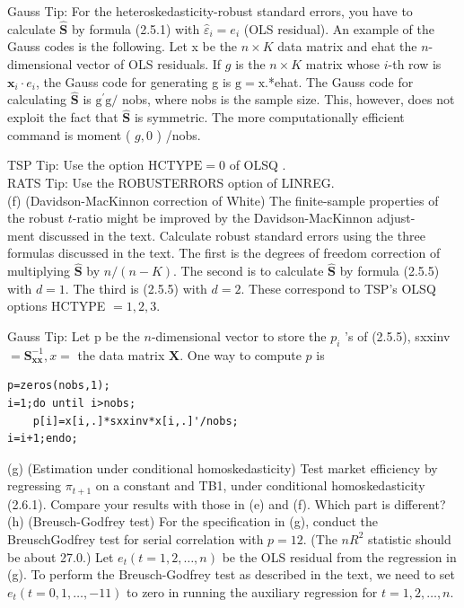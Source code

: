 \documentclass[10pt]{article}
\begin{document}
Gauss Tip: For the heteroskedasticity-robust standard errors, you have to calculate $\widehat{\mathbf{S}}$ by formula (2.5.1) with $\hat{\varepsilon}_{i}=e_{i}$ (OLS residual). An example of the Gauss codes is the following. Let x be the $n \times K$ data matrix and ehat the $n$-dimensional vector of OLS residuals. If $g$ is the $n \times K$ matrix whose $i$-th row is $\mathbf{x}_{i} \cdot e_{i}$, the Gauss code for generating g is $\mathrm{g}=\mathrm{x}$.*ehat. The Gauss code for calculating $\widehat{\mathbf{S}}$ is $\mathrm{g}^{\prime} \mathrm{g} /$ nobs, where nobs is the sample size. This, however, does not exploit the fact that $\widehat{\mathbf{S}}$ is symmetric. The more computationally efficient command is moment ( $g, 0$ ) /nobs.

TSP Tip: Use the option $\mathrm{HCTYPE}=0$ of OLSQ .\\
RATS Tip: Use the ROBUSTERRORS option of LINREG.\\
(f) (Davidson-MacKinnon correction of White) The finite-sample properties of the robust $t$-ratio might be improved by the Davidson-MacKinnon adjust-\\
ment discussed in the text. Calculate robust standard errors using the three formulas discussed in the text. The first is the degrees of freedom correction of multiplying $\widehat{\mathbf{S}}$ by $n /(n-K)$. The second is to calculate $\widehat{\mathbf{S}}$ by formula (2.5.5) with $d=1$. The third is (2.5.5) with $d=2$. These correspond to TSP's OLSQ options HCTYPE $=1,2,3$.

Gauss Tip: Let p be the $n$-dimensional vector to store the $p_{i}$ 's of (2.5.5), sxxinv $=\mathbf{S}_{\mathbf{x x}}^{-1}, x=$ the data matrix $\mathbf{X}$. One way to compute $p$ is

\begin{verbatim}
p=zeros(nobs,1);
i=1;do until i>nobs;
    p[i]=x[i,.]*sxxinv*x[i,.]'/nobs;
i=i+1;endo;
\end{verbatim}

(g) (Estimation under conditional homoskedasticity) Test market efficiency by regressing $\pi_{t+1}$ on a constant and TB1, under conditional homoskedasticity (2.6.1). Compare your results with those in (e) and (f). Which part is different?\\
(h) (Breusch-Godfrey test) For the specification in (g), conduct the BreuschGodfrey test for serial correlation with $p=12$. (The $n R^{2}$ statistic should be about 27.0.) Let $e_{t}(t=1,2, \ldots, n)$ be the OLS residual from the regression in (g). To perform the Breusch-Godfrey test as described in the text, we need to set $e_{t}(t=0,1, \ldots,-11)$ to zero in running the auxiliary regression for $t=1,2, \ldots, n$.
\end{document}
